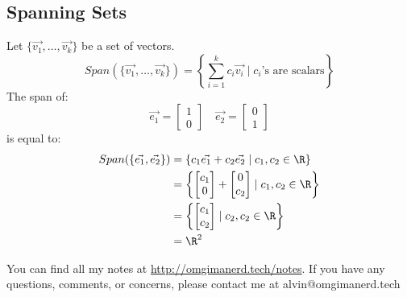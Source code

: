 \documentclass[letterpaper, 12pt]{math}
\begin{document}
\subsection*{Spanning Sets}
Let \( \{\vec{v_1},\dots,\vec{v_k}\} \) be a set of vectors.
\[ Span(\{\vec{v_1},\dots,\vec{v_k}\}) = \left\{\sum_{i=1}^{k}c_i\vec{v_i}\mid
  c_i \text{'s are scalars}\right\} \]
The span of:
\[ \vec{e_1} = \begin{bmatrix}1 \\ 0\end{bmatrix}\quad
  \vec{e_2} = \begin{bmatrix}0 \\ 1\end{bmatrix} \]
is equal to:
\begin{align*}
  Span(\{\vec{e_1},\vec{e_2}\}) &=
    \{c_1\vec{e_1}+c_2\vec{e_2}\mid c_1,c_2\in\R\} \\
  &= \left\{\begin{bmatrix}c_1 \\ 0\end{bmatrix}+
    \begin{bmatrix}0 \\ c_2\end{bmatrix}\mid c_1,c_2\in\R\right\} \\
  &= \left\{\begin{bmatrix}c_1 \\ c_2\end{bmatrix}\mid c_2,c_2\in\R\right\} \\
  &= \R^2
\end{align*}

\begin{center}
  You can find all my notes at \url{http://omgimanerd.tech/notes}. If you have
  any questions, comments, or concerns, please contact me at
  alvin@omgimanerd.tech
\end{center}
\end{document}
